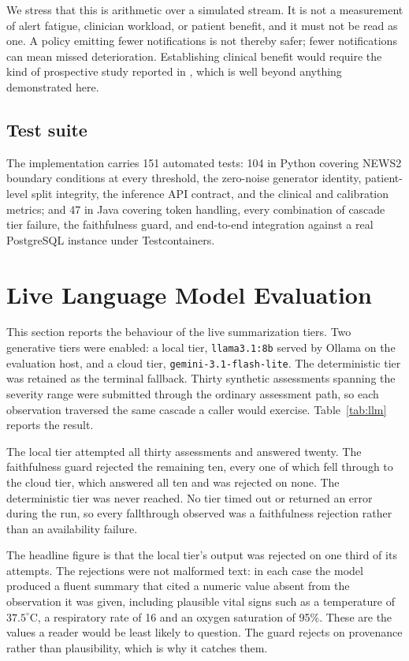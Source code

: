 \documentclass[lettersize,journal]{IEEEtran}
\begin{document}
We stress that this is arithmetic over a simulated stream. It is not a
measurement of alert fatigue, clinician workload, or patient benefit, and it
must not be read as one. A policy emitting fewer notifications is not thereby
safer; fewer notifications can mean missed deterioration. Establishing clinical
benefit would require the kind of prospective study reported in
\cite{escobar2020}, which is well beyond anything demonstrated here.

\subsection{Test suite}

The implementation carries 151 automated tests: 104 in Python covering NEWS2
boundary conditions at every threshold, the zero-noise generator identity,
patient-level split integrity, the inference API contract, and the clinical and
calibration metrics; and 47 in Java covering token handling, every combination
of cascade tier failure, the faithfulness guard, and end-to-end integration
against a real PostgreSQL instance under Testcontainers.

\section{Live Language Model Evaluation}
\label{sec:llm}

This section reports the behaviour of the live summarization tiers. Two
generative tiers were enabled: a local tier, \texttt{llama3.1:8b} served by
Ollama on the evaluation host, and a cloud tier, \texttt{gemini-3.1-flash-lite}.
The deterministic tier was retained as the terminal fallback. Thirty synthetic
assessments spanning the severity range were submitted through the ordinary
assessment path, so each observation traversed the same cascade a caller would
exercise. Table~\ref{tab:llm} reports the result.



The local tier attempted all thirty assessments and answered twenty. The
faithfulness guard rejected the remaining ten, every one of which fell through
to the cloud tier, which answered all ten and was rejected on none. The
deterministic tier was never reached. No tier timed out or returned an error
during the run, so every fallthrough observed was a faithfulness rejection
rather than an availability failure.

The headline figure is that the local tier's output was rejected on one third
of its attempts. The rejections were not malformed text: in each case the model
produced a fluent summary that cited a numeric value absent from the
observation it was given, including plausible vital signs such as a temperature
of $37.5^{\circ}$C, a respiratory rate of 16 and an oxygen saturation of 95\%.
These are the values a reader would be least likely to question. The guard
rejects on provenance rather than plausibility, which is why it catches them.
\end{document}
